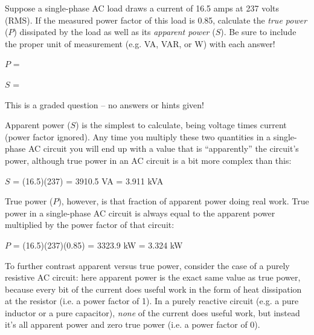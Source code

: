 

Suppose a single-phase AC load draws a current of 16.5 amps at 237 volts (RMS).  If the measured power factor of this load is 0.85, calculate the {\it true power} ($P$) dissipated by the load as well as its {\it apparent power} ($S$).  Be sure to include the proper unit of measurement (e.g. VA, VAR, or W) with each answer!

\vskip 10pt

$P$ = 

\vskip 40pt

$S$ = 

\vfil 

\eject






This is a graded question -- no answers or hints given!







Apparent power ($S$) is the simplest to calculate, being voltage times current (power factor ignored).  Any time you multiply these two quantities in a single-phase AC circuit you will end up with a value that is ``apparently'' the circuit's power, although true power in an AC circuit is a bit more complex than this:

\vskip 10pt

$S$ = (16.5)(237) = 3910.5 VA = 3.911 kVA

\vskip 30pt

True power ($P$), however, is that fraction of apparent power doing real work.  True power in a single-phase AC circuit is always equal to the apparent power multiplied by the power factor of that circuit:

\vskip 10pt

$P$ = (16.5)(237)(0.85) = 3323.9 kW = 3.324 kW

\vskip 10pt

To further contrast apparent versus true power, consider the case of a purely resistive AC circuit: here apparent power is the exact same value as true power, because every bit of the current does useful work in the form of heat dissipation at the resistor (i.e. a power factor of 1).  In a purely reactive circuit (e.g. a pure inductor or a pure capacitor), {\it none} of the current does useful work, but instead it's all apparent power and zero true power (i.e. a power factor of 0).



